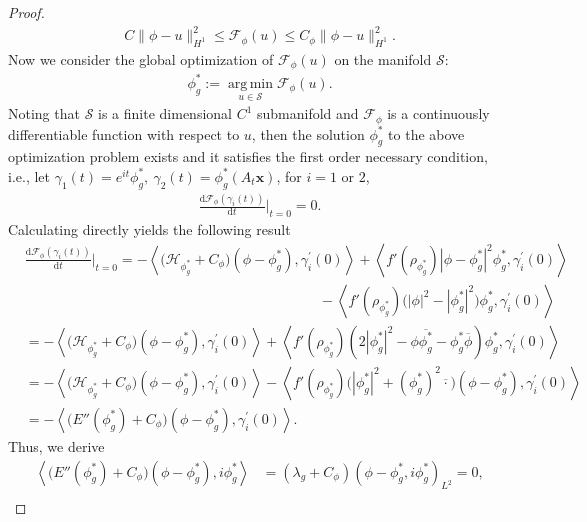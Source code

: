 \documentclass[preprint,3p]{elsarticle}
\DeclareMathOperator*{\argmin}{arg\,min}
\begin{document}
\begin{proof}
	\begin{align}\label{n-e}
		C\|\phi-u\|^2_{H^1}\le \mathcal{F}_{\phi}(u)\le C_{\phi}\|\phi-u\|^2_{H^1}.
	\end{align}
	Now we consider the global optimization of $\mathcal{F}_{\phi}(u)$ on the manifold $\mathcal{S}$:
	\begin{align*}
		\phi_g^*:=\argmin\limits_{u\in\mathcal{S}}\mathcal{F}_{\phi}(u).
	\end{align*}
	Noting that $\mathcal{S}$ is a finite dimensional $C^1$ submanifold and $\mathcal{F}_{\phi}$ is a {continuously} differentiable function with respect to $u$, then the solution $\phi_g^{*}$ to the above optimization problem exists and it satisfies the first order necessary condition, i.e., let $\gamma_1(t)=e^{it}\phi_g^{*},\ \gamma_2(t)=\phi_g^{*}(A_{t}\bm{x})$, for $i=1$ or $2$, 
	\begin{align*}
		\frac{\text{d}\mathcal{F}_{\phi}(\gamma_i(t))}{\text{d}t}\Bigg|_{t=0}=0.
	\end{align*}
	Calculating directly yields the following result
	\begin{align*}
		&\frac{\text{d}\mathcal{F}_{\phi}(\gamma_i(t))}{\text{d}t}\Bigg|_{t=0}=-\left\langle\big(\mathcal{H}_{\phi_g^{*}}+C_{\phi}\big)(\phi-\phi_g^{*}),\gamma^{\prime}_i(0)\right\rangle+\left\langle f'(\rho_{\phi_g^*})|\phi-\phi_g^{*}|^2\phi_g^{*},\gamma^{\prime}_i(0)\right\rangle\\
		&\qquad\qquad\qquad\qquad\qquad\qquad\qquad\qquad\qquad\qquad\quad-\left\langle f'(\rho_{\phi_g^*})\big(|\phi|^2-|\phi_g^{*}|^2\big)\phi_g^{*},\gamma^{\prime}_i(0)\right\rangle\\
		&=-\left\langle\big(\mathcal{H}_{\phi_g^{*}}+C_{\phi}\big)(\phi-\phi_g^{*}),\gamma^{\prime}_i(0)\right\rangle+\left\langle f'(\rho_{\phi_g^*})(2|\phi_g^{*}|^2-\phi\overline{\phi_g^{*}}-\phi_g^{*}\overline{\phi})\phi_g^{*},\gamma^{\prime}_i(0)\right\rangle\\
		&=-\left\langle\big(\mathcal{H}_{\phi_g^{*}}+C_{\phi}\big)(\phi-\phi_g^{*}),\gamma^{\prime}_i(0)\right\rangle-\left\langle f'(\rho_{\phi_g^*})\big(|\phi_g^{*}|^2+(\phi_g^{*})^2\overline{\cdot}\big)(\phi-\phi_g^{*}),\gamma^{\prime}_i(0)\right\rangle\\
		&=-\left\langle \big(E''(\phi_g^{*})+C_{\phi}\big)(\phi-\phi_g^{*}),\gamma^{\prime}_i(0)\right\rangle.
	\end{align*}
	Thus, we derive
	\begin{align*}
		\left\langle \big(E''(\phi_g^{*})+C_{\phi}\big)(\phi-\phi_g^*),i\phi_g^*\right\rangle&=\left(\lambda_g+C_{\phi}\right)( \phi-\phi_g^*,i\phi_g^*)_{L^2}=0,\\

\end{align*}
\end{proof}
\end{document}
